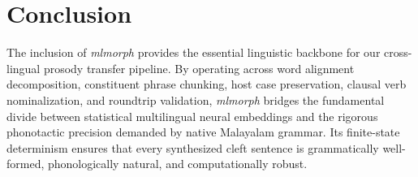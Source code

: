 \section{Conclusion}

The inclusion of \textit{mlmorph} provides the essential linguistic backbone for our cross-lingual prosody transfer pipeline. By operating across word alignment decomposition, constituent phrase chunking, host case preservation, clausal verb nominalization, and roundtrip validation, \textit{mlmorph} bridges the fundamental divide between statistical multilingual neural embeddings and the rigorous phonotactic precision demanded by native Malayalam grammar. Its finite-state determinism ensures that every synthesized cleft sentence is grammatically well-formed, phonologically natural, and computationally robust.
